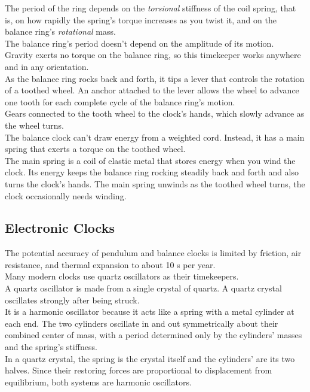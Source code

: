 \documentclass[12pt]{article}
\theoremstyle{definition}
\begin{document}
The period of the ring depends on the \emph{torsional} stiffness of the coil spring, that is, on how rapidly the spring's torque increases as you twist it, and on the balance ring's \emph{rotational} mass. \\
The balance ring's period doesn't depend on the amplitude of its motion. \\
Gravity exerts no torque on the balance ring, so this timekeeper works anywhere and in any orientation. \\

As the balance ring rocks back and forth, it tips a lever that controls the rotation of a toothed wheel.
An anchor attached to the lever allows the wheel to advance one tooth for each complete cycle of the balance ring's motion. \\
Gears connected to the tooth wheel to the clock's hands, which slowly advance as the wheel turns. \\
The balance clock can't draw energy from a weighted cord.
Instead, it has a main spring that exerts a torque on the toothed wheel. \\
The main spring is a coil of elastic metal that stores energy when you wind the clock.
Its energy keeps the balance ring rocking steadily back and forth and also turns the clock's hands.
The main spring unwinds as the toothed wheel turns, the clock occasionally needs winding.

\subsection{Electronic Clocks}
The potential accuracy of pendulum and balance clocks is limited by friction, air resistance, and thermal expansion to about 10 s per year. \\

Many modern clocks use quartz oscillators as their timekeepers. \\
A quartz oscillator is made from a single crystal of quartz.
A quartz crystal oscillates strongly after being struck. \\
It is a harmonic oscillator because it acts like a spring with a metal cylinder at each end.
The two cylinders oscillate in and out symmetrically about their combined center of mass, with a period determined only by the cylinders' masses and the spring's stiffness. \\
In a quartz crystal, the spring is the crystal itself and the cylinders' are its two halves.
Since their restoring forces are proportional to displacement from equilibrium, both systems are harmonic oscillators. \\
\end{document}
